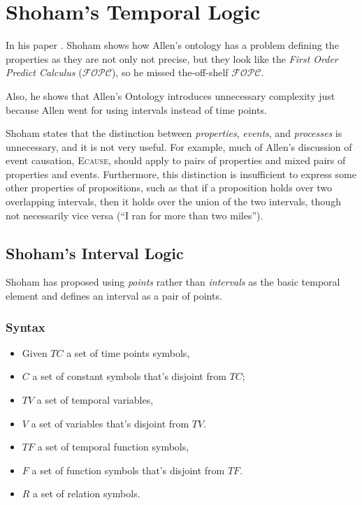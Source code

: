 \section{Shoham's Temporal Logic}

In his paper \cite{shoham1988temporal}.
Shoham shows how Allen's ontology has a problem defining the properties as they are not only not precise, but they look like the \textit{First Order Predict Calculus}
($\mathcal{FOPC}$), so he missed the-off-shelf $\mathcal{FOPC}$.

Also, he shows that Allen's Ontology introduces unnecessary complexity just because Allen went for using intervals instead of time points.

Shoham states that the distinction between \textit{properties}, \textit{events}, and \textit{processes} is unnecessary, and it is not very useful.
For example, much of Allen's discussion of event causation, \textsc{Ecause}, should apply to pairs of properties and mixed pairs of properties and events. Furthermore, this distinction is insufficient to express some other properties of propositions, such as that if a proposition holds over two overlapping intervals, then it holds over
the union of the two intervals, though not necessarily vice versa (``I ran for more than two miles'').


\subsection{Shoham's Interval Logic}
Shoham has proposed using \textit{points} rather than \textit{intervals} as the basic temporal element and defines an interval as a pair of points.
\subsubsection{Syntax}
\begin{itemize}
	\item Given $TC$ a set of time points symbols,
	\item $C$ a set of constant symbols that's disjoint from $TC$;
	\item $TV$ a set of temporal variables,
	\item $V$ a set of variables that's disjoint from $TV$.
	\item $TF$ a set of temporal function symbols,
	\item $F$ a set of function symbols that's disjoint from $TF$.
	\item $R$ a set of relation symbols.
\end{itemize}

